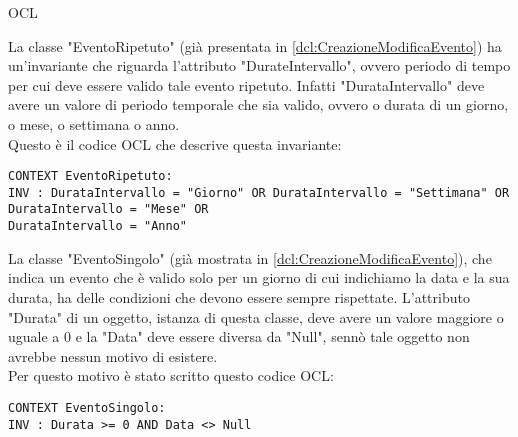 \begin{listaPersonale}{OCL}
    \begin{center}
        
    \end{center}
    La classe "EventoRipetuto" (già presentata in \ref{dcl:CreazioneModificaEvento}) ha un'invariante che riguarda l'attributo "DurateIntervallo", ovvero periodo di tempo per cui deve essere valido tale evento ripetuto. Infatti "DurataIntervallo" deve avere un valore di periodo temporale che sia valido, ovvero o durata di un giorno, o mese, o settimana o anno. \\
    Questo è il codice OCL che descrive questa invariante:
    \begin{lstlisting}
CONTEXT EventoRipetuto:
INV : DurataIntervallo = "Giorno" OR DurataIntervallo = "Settimana" OR DurataIntervallo = "Mese" OR 
DurataIntervallo = "Anno"
    \end{lstlisting}




    \begin{center}
        
    \end{center}
    La classe "EventoSingolo" (già mostrata in \ref{dcl:CreazioneModificaEvento}), che indica un evento che è valido solo per un giorno di cui indichiamo la data e la sua durata, ha delle condizioni che devono essere sempre rispettate. L'attributo "Durata" di un oggetto, istanza di questa classe, deve avere un valore maggiore o uguale a 0 e la "Data" deve essere diversa da "Null", sennò tale oggetto non avrebbe nessun motivo di esistere. \\
    Per questo motivo è stato scritto questo codice OCL:

    \begin{lstlisting}
CONTEXT EventoSingolo:
INV : Durata >= 0 AND Data <> Null
    \end{lstlisting}
    \newpage




\end{listaPersonale}
